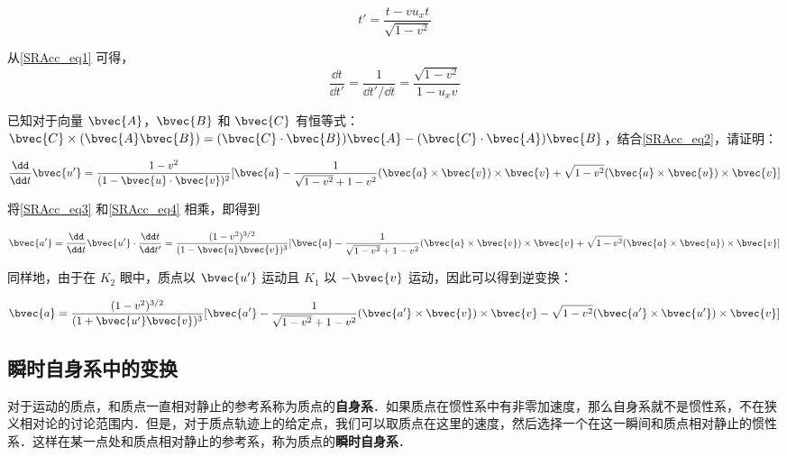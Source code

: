 \begin{equation}\label{SRAcc_eq1}
t'=\frac{t-vu_xt}{\sqrt{1-v^2}}
\end{equation}

从\autoref{SRAcc_eq1} 可得，
\begin{equation}\label{SRAcc_eq3}
\frac{\dd t}{\dd t'}=\frac{1}{\dd t'/\dd t}=\frac{\sqrt{1-v^2}}{1-u_xv}
\end{equation}

\begin{exercise}{}

已知对于向量 $\bvec{A}$，$\bvec{B}$ 和 $\bvec{C}$ 有恒等式：$\bvec{C}\times(\bvec{A}\bvec{B})=(\bvec{C}\cdot\bvec{B})\bvec{A}-(\bvec{C}\cdot\bvec{A})\bvec{B}$，结合\autoref{SRAcc_eq2}，请证明：

\begin{equation}\label{SRAcc_eq4}
\frac{\dd}{\dd t}\bvec{u'}=\frac{1-v^2}{(1-\bvec{u}\cdot\bvec{v})^2}[\bvec{a}-\frac{1}{\sqrt{1-v^2}+1-v^2}(\bvec{a}\times\bvec{v})\times\bvec{v}+\sqrt{1-v^2}(\bvec{a}\times\bvec{u})\times\bvec{v}]
\end{equation}

\end{exercise}

将\autoref{SRAcc_eq3} 和\autoref{SRAcc_eq4} 相乘，即得到

\begin{equation}
\bvec{a'}=\frac{\dd}{\dd t}\bvec{u'}\cdot\frac{\dd t}{\dd t'}=\frac{(1-v^2)^{3/2}}{(1-\bvec{u}\bvec{v})^3}[\bvec{a}-\frac{1}{\sqrt{1-v^2}+1-v^2}(\bvec{a}\times\bvec{v})\times\bvec{v}+\sqrt{1-v^2}(\bvec{a}\times\bvec{u})\times\bvec{v}]
\end{equation}

同样地，由于在 $K_2$ 眼中，质点以 $\bvec{u'}$ 运动且 $K_1$ 以 $-\bvec{v}$ 运动，因此可以得到逆变换：

\begin{equation}\label{SRAcc_eq5}
\bvec{a}=\frac{(1-v^2)^{3/2}}{(1+\bvec{u'}\bvec{v})^3}[\bvec{a'}-\frac{1}{\sqrt{1-v^2}+1-v^2}(\bvec{a'}\times\bvec{v})\times\bvec{v}-\sqrt{1-v^2}(\bvec{a'}\times\bvec{u'})\times\bvec{v}]
\end{equation}


\subsection{瞬时自身系中的变换}

对于运动的质点，和质点一直相对静止的参考系称为质点的\textbf{自身系}．如果质点在惯性系中有非零加速度，那么自身系就不是惯性系，不在狭义相对论的讨论范围内．但是，对于质点轨迹上的给定点，我们可以取质点在这里的速度，然后选择一个在这一瞬间和质点相对静止的惯性系．这样在某一点处和质点相对静止的参考系，称为质点的\textbf{瞬时自身系}．


